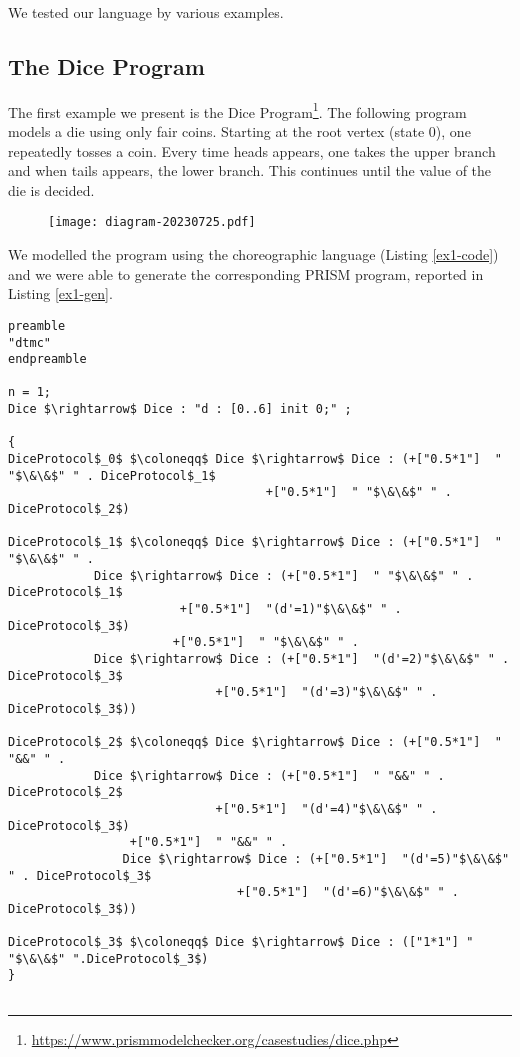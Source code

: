 
We tested our language by various examples.

\subsection{The Dice Program}
 The first example we present is the Dice Program\footnote{\url{https://www.prismmodelchecker.org/casestudies/dice.php}}. The following program models a die using only fair coins. Starting at the root vertex (state 0), one repeatedly tosses a coin. Every time heads appears, one takes the upper branch and when tails appears, the lower branch. This continues until the value of the die is decided.


\begin{figure}[h]
\centering
\texttt{[image: diagram-20230725.pdf]}	
\end{figure}

We modelled the program using the choreographic language (Listing \ref{ex1-code}) and we were able to generate the corresponding PRISM program, reported in Listing \ref{ex1-gen}.

\begin{lstlisting}[style=chor-color,caption={Choreographic language for the Dice Program.},captionpos=b,label={ex1-code}]
preamble
"dtmc"
endpreamble

n = 1;
Dice $\rightarrow$ Dice : "d : [0..6] init 0;" ;

{
DiceProtocol$_0$ $\coloneqq$ Dice $\rightarrow$ Dice : (+["0.5*1"]  " "$\&\&$" " . DiceProtocol$_1$
                                    +["0.5*1"]  " "$\&\&$" " .  DiceProtocol$_2$)

DiceProtocol$_1$ $\coloneqq$ Dice $\rightarrow$ Dice : (+["0.5*1"]  " "$\&\&$" " . 
 			Dice $\rightarrow$ Dice : (+["0.5*1"]  " "$\&\&$" " . DiceProtocol$_1$
           	 		 	+["0.5*1"]  "(d'=1)"$\&\&$" " . DiceProtocol$_3$)
     				   +["0.5*1"]  " "$\&\&$" " .  
   			Dice $\rightarrow$ Dice : (+["0.5*1"]  "(d'=2)"$\&\&$" " . DiceProtocol$_3$
           	 		         +["0.5*1"]  "(d'=3)"$\&\&$" " . DiceProtocol$_3$))

DiceProtocol$_2$ $\coloneqq$ Dice $\rightarrow$ Dice : (+["0.5*1"]  " "&&" " . 
	 		Dice $\rightarrow$ Dice : (+["0.5*1"]  " "&&" " . DiceProtocol$_2$
	 	                	 +["0.5*1"]  "(d'=4)"$\&\&$" " . DiceProtocol$_3$)
	 			 +["0.5*1"]  " "&&" " . 
	    		Dice $\rightarrow$ Dice : (+["0.5*1"]  "(d'=5)"$\&\&$" " . DiceProtocol$_3$
	                     		+["0.5*1"]  "(d'=6)"$\&\&$" " . DiceProtocol$_3$))

DiceProtocol$_3$ $\coloneqq$ Dice $\rightarrow$ Dice : (["1*1"] " "$\&\&$" ".DiceProtocol$_3$)
}
	
\end{lstlisting}


